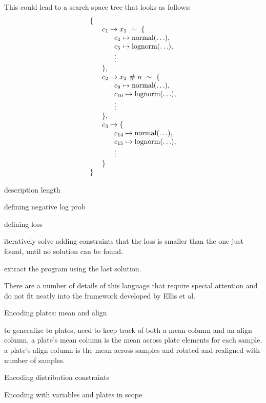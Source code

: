 \documentclass[runningheads]{llncs}
\begin{document}
This could lead to a search space tree that looks as follows:
\[
  \begin{array}{l }
    \{ \\
    \hspace{6mm} c_1 \mapsto x_1\ \sim\ \{ \\
        \hspace{12mm} c_4 \mapsto \text{normal}(\hdots), \\
        \hspace{12mm} c_5 \mapsto \text{lognorm}(\hdots), \\ 
        \hspace{12mm} \vdots \\
    \hspace{6mm}\},\\
    \hspace{6mm} c_2 \mapsto x_2\ \#\ n\ \sim\ \{ \\
        \hspace{12mm} c_9 \mapsto \text{normal}(\hdots), \\
        \hspace{12mm} c_{10} \mapsto \text{lognorm}(\hdots), \\ 
        \hspace{12mm} \vdots \\
    \hspace{6mm}\},\\
    \hspace{6mm} c_3 \mapsto \{ \\
        \hspace{12mm} c_{14} \mapsto \text{normal}(\hdots), \\
        \hspace{12mm} c_{15} \mapsto \text{lognorm}(\hdots), \\ 
        \hspace{12mm} \vdots \\
    \hspace{6mm}\}\\
    \}
    
  \end{array}
\]

description length

defining negative log prob

defining loss

iteratively solve adding constraints that the loss
is smaller than the one just found,
until no solution can be found.

extract the program using the last solution. 

There are a number of details of this language that require 
special attention and do not fit neatly into the framework  
developed by Ellis et al.

Encoding plates: mean and align

to generalize to plates, need to keep track of both a mean column and an align column.
a plate's mean column is the mean across plate elements for each sample. 
a plate's align column is the mean across samples and rotated and realigned with number of samples. 

Encoding distribution constraints

Encoding with variables and plates in scope
\end{document}
